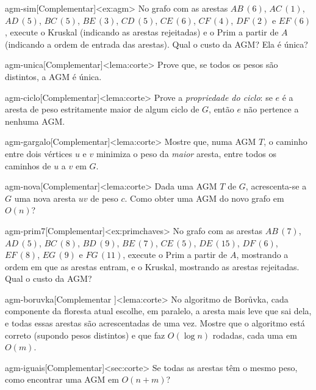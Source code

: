 \excompl
\begin{exercicio}{agm-sim}[Complementar]<ex:agm>
No grafo com as arestas $AB\,(6)$, $AC\,(1)$, $AD\,(5)$, $BC\,(5)$, $BE\,(3)$, $CD\,(5)$, $CE\,(6)$, $CF\,(4)$, $DF\,(2)$ e $EF\,(6)$, execute o Kruskal (indicando as arestas rejeitadas) e o Prim a partir de $A$ (indicando a ordem de entrada das arestas). Qual o custo da AGM? Ela é única?
\end{exercicio}
\begin{exercicio}{agm-unica}[Complementar]<lema:corte>
Prove que, se todos os pesos são distintos, a AGM é única.
\end{exercicio}
\begin{exercicio}{agm-ciclo}[Complementar]<lema:corte>
Prove a \emph{propriedade do ciclo}: se $e$ é a aresta de peso estritamente maior de algum ciclo de $G$, então $e$ não pertence a nenhuma AGM.
\end{exercicio}
\begin{exercicio}{agm-gargalo}[Complementar]<lema:corte>
Mostre que, numa AGM $T$, o caminho entre dois vértices $u$ e $v$ minimiza o peso da \emph{maior} aresta, entre todos os caminhos de $u$ a $v$ em $G$.
\end{exercicio}
\begin{exercicio}{agm-nova}[Complementar]<lema:corte>
Dada uma AGM $T$ de $G$, acrescenta-se a $G$ uma nova aresta $uv$ de peso $c$. Como obter uma AGM do novo grafo em $O(n)$?
\end{exercicio}
\begin{exercicio}{agm-prim7}[Complementar]<ex:primchaves>
No grafo com as arestas $AB\,(7)$, $AD\,(5)$, $BC\,(8)$, $BD\,(9)$, $BE\,(7)$, $CE\,(5)$, $DE\,(15)$, $DF\,(6)$, $EF\,(8)$, $EG\,(9)$ e $FG\,(11)$, execute o Prim a partir de $A$, mostrando a ordem em que as arestas entram, e o Kruskal, mostrando as arestas rejeitadas. Qual o custo da AGM?
\end{exercicio}
\begin{exercicio}{agm-boruvka}[Complementar \estrela]<lema:corte>
No algoritmo de Borůvka, cada componente da floresta atual escolhe, em paralelo, a aresta mais leve que sai dela, e todas essas arestas são acrescentadas de uma vez. Mostre que o algoritmo está correto (supondo pesos distintos) e que faz $O(\log n)$ rodadas, cada uma em $O(m)$.
\end{exercicio}
\begin{exercicio}{agm-iguais}[Complementar]<sec:corte>
Se todas as arestas têm o mesmo peso, como encontrar uma AGM em $O(n+m)$?
\end{exercicio}
